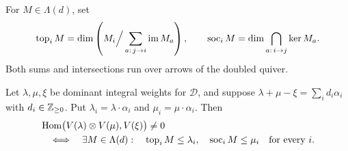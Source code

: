 For \(M\in\Lambda(d)\), set
\[
 \operatorname{top}_i M
 =\dim\left(M_i\Big/\sum_{a:\,j\to i}\operatorname{im} M_a\right),
 \qquad
 \operatorname{soc}_i M
 =\dim\bigcap_{a:\,i\to j}\ker M_a .
\]
Both sums and intersections run over arrows of the doubled quiver.

\begin{proposition}\label{prop:preprojective}
Let \(\lambda,\mu,\xi\) be dominant integral weights for \(\mathcal D\),
and suppose
\(\lambda+\mu-\xi=\sum_i d_i\alpha_i\) with \(d_i\in\mathbb Z_{\ge0}\).
Put \(\lambda_i=\lambda\cdot\alpha_i\) and
\(\mu_i=\mu\cdot\alpha_i\).  Then
\begin{equation}\label{tail:tensor-criterion}
 \begin{aligned}
 &\operatorname{Hom}\bigl(V(\lambda)\otimes V(\mu),V(\xi)\bigr)\ne0\\
 &\quad\Longleftrightarrow\quad
 \exists M\in\Lambda(d):
 \quad \operatorname{top}_i M\le\lambda_i,\quad
       \operatorname{soc}_i M\le\mu_i\quad\text{for every }i .
 \end{aligned}
\end{equation}
\end{proposition}


